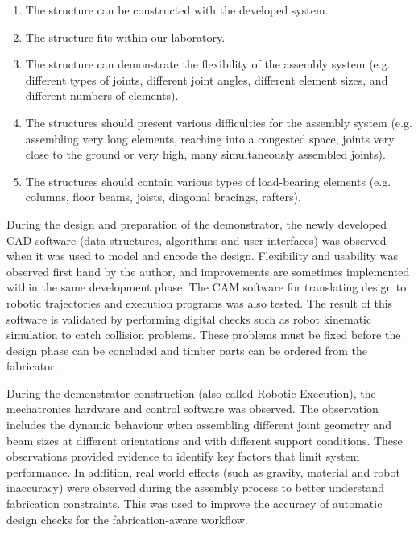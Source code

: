 \begin{enumerate}
	\item The structure can be constructed with the developed system.

	\item The structure fits within our laboratory.

	\item The structure can demonstrate the flexibility of the assembly system (e.g. different types of joints, different joint angles, different element sizes, and different numbers of elements).

	\item The structures should present various difficulties for the assembly system (e.g. assembling very long elements, reaching into a congested space, joints very close to the ground or very high, many simultaneously assembled joints).

	\item The structures should contain various types of load-bearing elements (e.g. columns, floor beams, joists, diagonal bracings, rafters).

\end{enumerate}
During the design and preparation of the demonstrator, the newly developed CAD software (data structures, algorithms and user interfaces) was observed when it was used to model and encode the design. Flexibility and usability was observed first hand by the author, and improvements are sometimes implemented within the same development phase. The CAM software for translating design to robotic trajectories and execution programs was also tested. The result of this software is validated by performing digital checks such as robot kinematic simulation to catch collision problems. These problems must be fixed before the design phase can be concluded and timber parts can be ordered from the fabricator. 

During the demonstrator construction (also called Robotic Execution), the mechatronics hardware and control software was observed. The observation includes the dynamic behaviour when assembling different joint geometry and beam sizes at different orientations and with different support conditions. These observations provided evidence to identify key factors that limit system performance.  In addition, real world effects (such as gravity, material and robot inaccuracy) were observed during the assembly process to better understand fabrication constraints. This was used to improve the accuracy of automatic design checks for the fabrication-aware workflow.

